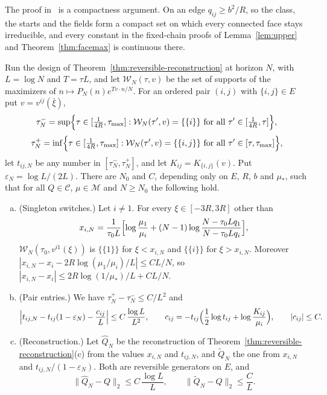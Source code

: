 The proof in~\cite{paperC1} is a compactness argument. On an edge $q_{ij}\ge b^2/R$, so the
class, the starts and the fields form a compact set on which every connected face stays
irreducible, and every constant in the fixed-chain proofs of Lemma~\ref{lem:upper} and
Theorem~\ref{thm:facemax} is continuous there.

\begin{theorem}\label{thm:finite-horizon}
Run the design of Theorem~\ref{thm:reversible-reconstruction} at horizon $N$, with $L=\log N$ and
$T=\tau L$, and let $\mathcal W_N(\tau,v)$ be the set of supports of the maximizers of
$n\mapsto P_N(n)e^{Tv\cdot n/N}$. For an ordered pair $(i,j)$ with $\{i,j\}\in E$ put
$v=v^{ij}(\bar\xi)$,
\[
 \tau^-_N=\sup\Bigl\{\tau\in[\tfrac1{4R},\tau_{\max}]:\mathcal W_N(\tau',v)=\{\{i\}\}\text{ for all }\tau'\in[\tfrac1{4R},\tau]\Bigr\},
\]
\[
 \tau^+_N=\inf\Bigl\{\tau\in[\tfrac1{4R},\tau_{\max}]:\mathcal W_N(\tau',v)=\{\{i,j\}\}\text{ for all }\tau'\in[\tau,\tau_{\max}]\Bigr\},
\]
let $t_{ij,N}$ be any number in $[\tau^-_N,\tau^+_N]$, and let $K_{ij}=K_{\{i,j\}}(v)$. Put
$\varepsilon_N=\log L/(2L)$. There are $N_0$ and $C$, depending only on $E$, $R$, $b$ and
$\mu_*$, such that for all $Q\in\mathcal C$, $\mu\in\mathcal M$ and $N\ge N_0$ the following
hold.
\begin{enumerate}[(a)]
\item (Singleton switches.) Let $i\ne1$. For every $\xi\in[-3R,3R]$ other than
\[
 x_{i,N}=\frac1{\tau_0L}\Bigl[\log\frac{\mu_1}{\mu_i}+(N-1)\log\frac{N-\tau_0Lq_1}{N-\tau_0Lq_i}\Bigr],
\]
$\mathcal W_N(\tau_0,v^{i1}(\xi))$ is $\{\{1\}\}$ for $\xi<x_{i,N}$ and $\{\{i\}\}$ for
$\xi>x_{i,N}$. Moreover $|x_{i,N}-x_i-2R\log(\mu_1/\mu_i)/L|\le CL/N$, so
$|x_{i,N}-x_i|\le2R\log(1/\mu_*)/L+CL/N$.
\item (Pair entries.) We have $\tau^+_N-\tau^-_N\le C/L^2$ and
\[
 \Bigl|t_{ij,N}-t_{ij}(1-\varepsilon_N)-\frac{c_{ij}}L\Bigr|\le C\,\frac{\log L}{L^2},\qquad
 c_{ij}=-t_{ij}\Bigl(\frac12\log t_{ij}+\log\frac{K_{ij}}{\mu_i}\Bigr),\qquad|c_{ij}|\le C .
\]
\item (Reconstruction.) Let $\widehat Q_N$ be the reconstruction of
Theorem~\ref{thm:reversible-reconstruction}(c) from the values $x_{i,N}$ and $t_{ij,N}$, and
$\widetilde Q_N$ the one from $x_{i,N}$ and $t_{ij,N}/(1-\varepsilon_N)$. Both are reversible
generators on $E$, and
\[
 \|\widehat Q_N-Q\|_2\le C\,\frac{\log L}L,\qquad\|\widetilde Q_N-Q\|_2\le\frac CL .
\]
\end{enumerate}
\end{theorem}

